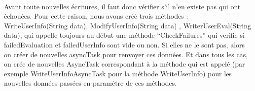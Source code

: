\documentclass[a4paper, 10pt]{article}
\begin{document}
\paragraph{}
Avant toute nouvelles écritures, il faut donc vérifier s’il n’en existe pas qui ont échouées.
Pour cette raison, nous avons créé trois méthodes : WriteUserInfo(String data), ModifyUserInfo(String data) , WriterUserEval(String data), qui appelle toujours au début une méthode “CheckFailures” qui verifie si failedEvaluation et failedUserInfo sont vide ou non. Si elles ne le sont pas, alors on créer de nouvelles asyncTask pour renvoyer ces données. Et dans tous les cas, on crée de nouvelles AsyncTask correspondant à la méthode qui est appelé (par exemple WriteUserInfoAsyncTask pour la méthode WriteUserInfo) pour les nouvelles données passées en paramètre de ces méthodes.

	
\end{document}
